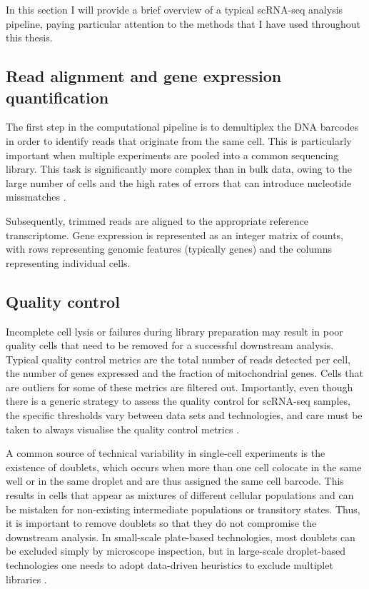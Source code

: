 In this section I will provide a brief overview of a typical scRNA-seq analysis pipeline, paying particular attention to the methods that I have used throughout this thesis.

\subsection{Read alignment and gene expression quantification}

The first step in the computational pipeline is to demultiplex the DNA barcodes in order to identify reads that originate from the same cell. This is particularly important when multiple experiments are pooled into a common sequencing library. This task is significantly more complex than in bulk data, owing to the large number of cells and the high rates of errors that can introduce nucleotide missmatches \cite{Tambe2019}.

Subsequently, trimmed reads are aligned to the appropriate reference transcriptome. Gene expression is represented as an integer matrix of counts, with rows representing genomic features (typically genes) and the columns representing individual cells. 

\subsection{Quality control}

Incomplete cell lysis or failures during library preparation may result in poor quality cells that need to be removed for a successful downstream analysis. Typical quality control metrics are the total number of reads detected per cell, the number of genes expressed and the fraction of mitochondrial genes. Cells that are outliers for some of these metrics are filtered out. Importantly, even though there is a generic strategy to assess the quality control for scRNA-seq samples, the specific thresholds vary between data sets and technologies, and care must be taken to always visualise the quality control metrics \cite{Luecken2019}.

A common source of technical variability in single-cell experiments is the existence of doublets, which occurs when more than one cell colocate in the same well or in the same droplet and are thus assigned the same cell barcode. This results in cells that appear as mixtures of different cellular populations and can be mistaken for non-existing intermediate populations or transitory states.  Thus, it is important to remove doublets so that they do not compromise the downstream analysis. In small-scale plate-based technologies, most doublets can be excluded simply by microscope inspection, but in large-scale droplet-based technologies one needs to adopt data-driven heuristics to exclude multiplet libraries \cite{McGinnis2019}. 


